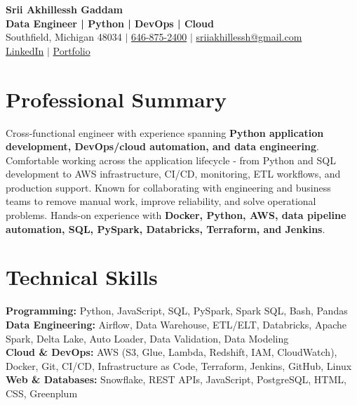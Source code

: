 \documentclass[letterpaper,10pt]{article}
\begin{document}
\fontsize{9.35pt}{10.45pt}\selectfont

\begin{center}
    {\LARGE \textbf{Srii Akhillessh Gaddam}} \\[-1pt]
    \textbf{Data Engineer | Python | DevOps | Cloud} \\[2pt]
    Southfield, Michigan 48034 $|$
    \href{tel:6468752400}{646-875-2400} $|$
    \href{mailto:sriiakhillessh@gmail.com}{sriiakhillessh@gmail.com} \\[1pt]
    \href{https://www.linkedin.com/in/srii-akhiilessh-gaddam-b48668191/}{LinkedIn} $|$
    \href{https://sriiakhillesshg.github.io/portfolio/}{Portfolio}
\end{center}
\vspace{-8pt}

\section{Professional Summary}
\small{Cross-functional engineer with experience spanning \textbf{Python application development, DevOps/cloud automation, and data engineering}. Comfortable working across the application lifecycle - from Python and SQL development to AWS infrastructure, CI/CD, monitoring, ETL workflows, and production support. Known for collaborating with engineering and business teams to remove manual work, improve reliability, and solve operational problems. Hands-on experience with \textbf{Docker, Python, AWS, data pipeline automation, SQL, PySpark, Databricks, Terraform, and Jenkins}.}

\section{Technical Skills}
\small{
\textbf{Programming:} Python, JavaScript, SQL, PySpark, Spark SQL, Bash, Pandas \\
\textbf{Data Engineering:} Airflow, Data Warehouse, ETL/ELT, Databricks, Apache Spark, Delta Lake, Auto Loader, Data Validation, Data Modeling \\
\textbf{Cloud \& DevOps:} AWS (S3, Glue, Lambda, Redshift, IAM, CloudWatch), Docker, Git, CI/CD, Infrastructure as Code, Terraform, Jenkins, GitHub, Linux \\
\textbf{Web \& Databases:} Snowflake, REST APIs, JavaScript, PostgreSQL, HTML, CSS, Greenplum
}
\end{document}
